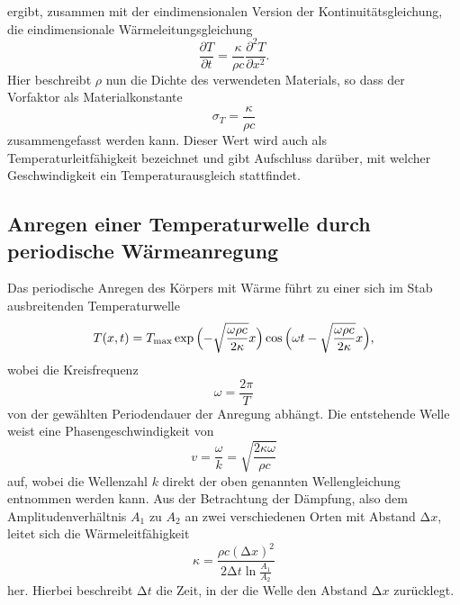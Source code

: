 ergibt, zusammen mit der eindimensionalen Version der Kontinuitätsgleichung, die eindimensionale Wärmeleitungsgleichung
\begin{equation}
  \frac{\partial T}{\partial t} = \frac{\kappa}{\rho c} \frac{\partial^2 T}{\partial x^2}.
  \label{eqn:dgl}
\end{equation}
Hier beschreibt $\rho$ nun die Dichte des verwendeten Materials, so dass der Vorfaktor als Materialkonstante
\begin{equation}
  \sigma_T = \frac{\kappa}{\rho c}
\end{equation}
zusammengefasst werden kann.
Dieser Wert wird auch als Temperaturleitfähigkeit bezeichnet und gibt Aufschluss darüber, mit welcher Geschwindigkeit ein Temperaturausgleich stattfindet.\\
\subsection{Anregen einer Temperaturwelle durch periodische Wärmeanregung}
Das periodische Anregen des Körpers mit Wärme führt zu einer sich im Stab ausbreitenden Temperaturwelle
\begin{equation}
  T(x,t) = T_{\text{max}} \exp{\Bigl( -\sqrt{\frac{\omega \rho c}{2 \kappa} } x \Bigr)} \cos{\Bigl( \omega t - \sqrt{\frac{\omega \rho c}{2 \kappa}} x \Bigr)},
\end{equation}
wobei die Kreisfrequenz
\begin{equation}
  \omega = \frac{2 \pi}{T}
\end{equation}
von der gewählten Periodendauer der Anregung abhängt.
Die entstehende Welle weist eine Phasengeschwindigkeit von
\begin{equation}
  v = \frac{\omega}{k} = \sqrt{\frac{2 \kappa \omega}{\rho c}}
\end{equation}
auf, wobei die Wellenzahl $k$ direkt der oben genannten Wellengleichung entnommen werden kann.
Aus der Betrachtung der Dämpfung, also dem Amplitudenverhältnis $A_1$ zu $A_2$ an zwei verschiedenen Orten mit Abstand $\increment{x}$, leitet sich die Wärmeleitfähigkeit
\begin{equation}
  \kappa = \frac{\rho c (\increment{x})^2}{2 \increment{t} \ln{ \frac{A_1}{A_2} }}
  \label{eqn:wlf}
\end{equation}
her.
Hierbei beschreibt $\increment{t}$ die Zeit, in der die Welle den Abstand $\increment{x}$ zurücklegt.\\
